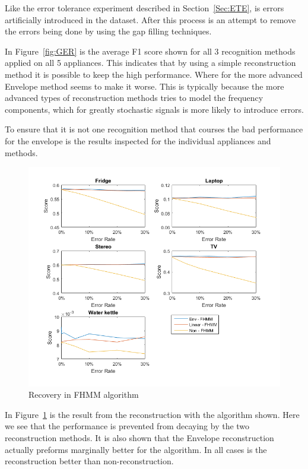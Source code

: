 Like the error tolerance experiment described in Section~\ref{Sec:ETE}, is errors artificially introduced in the dataset. After this process is an attempt to remove the errors being done by using the gap filling techniques. 

In Figure~\ref{fig:GER} is the average F1 score shown for all 3 recognition methods applied on all 5 appliances. This indicates that by using a simple reconstruction method it is possible to keep the high performance. Where for the more advanced Envelope method seems to make it worse. This is typically because the more advanced types of reconstruction methods tries to model the frequency components, which for greatly stochastic signals is more likely to introduce errors. 

To ensure that it is not one recognition method that courses the bad performance for the envelope is the results inspected for the individual appliances and methods. 


\newpage

\begin{figure}[H]
\centering
\includegraphics[width=1\textwidth]{billeder/Rec-FHMM.png}
\caption{Recovery in FHMM algorithm}
\label{fig:ERFHMM}
\end{figure}

In Figure~\ref{fig:ERFHMM} is the result from the reconstruction with the  algorithm shown. Here we see that the performance is prevented from decaying by the two reconstruction methods. It is also shown that the Envelope reconstruction actually preforms marginally better for the  algorithm. In all cases is the reconstruction better than non-reconstruction. 

